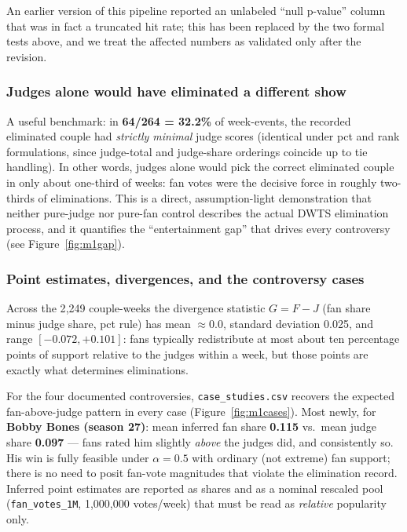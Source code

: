 \documentclass[11pt]{article}
\begin{document}
An earlier version of this pipeline reported an unlabeled ``null p-value'' column that
was in fact a truncated hit rate; this has been replaced by the two formal tests above,
and we treat the affected numbers as validated only after the revision.

\subsubsection{Judges alone would have eliminated a different show}

A useful benchmark: in \textbf{64/264 = 32.2\%} of week-events, the recorded eliminated
couple had \emph{strictly minimal} judge scores (identical under pct and rank
formulations, since judge-total and judge-share orderings coincide up to tie handling).
In other words, judges alone would pick the correct eliminated couple in only about
one-third of weeks: fan votes were the decisive force in roughly two-thirds of
eliminations. This is a direct, assumption-light demonstration that neither pure-judge
nor pure-fan control describes the actual DWTS elimination process, and it quantifies
the ``entertainment gap'' that drives every controversy (see Figure~\ref{fig:m1gap}).

\subsubsection{Point estimates, divergences, and the controversy cases}

Across the 2{,}249 couple-weeks the divergence statistic $G = F - J$ (fan share minus
judge share, pct rule) has mean $\approx 0.0$, standard deviation 0.025, and range
$[-0.072, +0.101]$: fans typically redistribute at most about ten percentage points of
support relative to the judges within a week, but those points are exactly what
determines eliminations.

For the four documented controversies, \texttt{case\_studies.csv} recovers the expected
fan-above-judge pattern in every case (Figure~\ref{fig:m1cases}). Most newly, for
\textbf{Bobby Bones (season 27)}: mean inferred fan share \textbf{0.115} vs.\ mean judge
share \textbf{0.097} --- fans rated him slightly \emph{above} the judges did, and
consistently so. His win is fully feasible under $\alpha = 0.5$ with ordinary (not
extreme) fan support; there is no need to posit fan-vote magnitudes that violate the
elimination record. Inferred point estimates are reported as shares and as a nominal
rescaled pool (\texttt{fan\_votes\_1M}, 1{,}000{,}000 votes/week) that must be read as
\emph{relative} popularity only.
\end{document}
